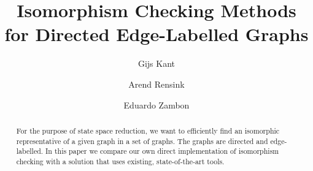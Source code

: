 
\mainmatter  %

\title{Isomorphism Checking Methods for Directed Edge-Labelled Graphs}


\author{Gijs Kant \and Arend Rensink \and Eduardo Zambon}



\maketitle

\begin{abstract}
  For the purpose of state space reduction, we want to efficiently find an
  isomorphic representative of a given graph in a set of graphs. The graphs are
  directed and edge-labelled. In this paper we compare our own direct
  implementation of isomorphism checking with a solution that uses existing,
  state-of-the-art tools.
\end{abstract}

